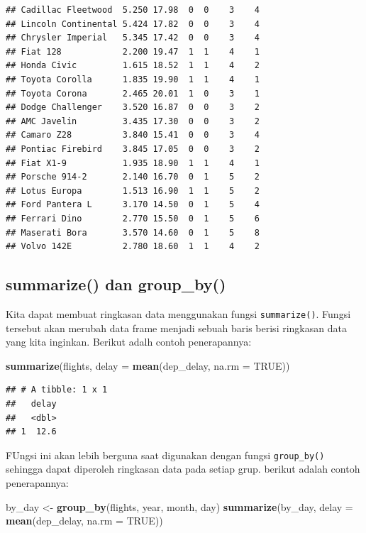 \documentclass[]{book}
\newenvironment{Shaded}{\begin{snugshade}}{\end{snugshade}}
\newcommand{\KeywordTok}[1]{\textcolor[rgb]{0.13,0.29,0.53}{\textbf{#1}}}
\newcommand{\DataTypeTok}[1]{\textcolor[rgb]{0.13,0.29,0.53}{#1}}
\newcommand{\StringTok}[1]{\textcolor[rgb]{0.31,0.60,0.02}{#1}}
\newcommand{\OtherTok}[1]{\textcolor[rgb]{0.56,0.35,0.01}{#1}}
\newcommand{\NormalTok}[1]{#1}
\begin{document}
\begin{verbatim}
## Cadillac Fleetwood  5.250 17.98  0  0    3    4
## Lincoln Continental 5.424 17.82  0  0    3    4
## Chrysler Imperial   5.345 17.42  0  0    3    4
## Fiat 128            2.200 19.47  1  1    4    1
## Honda Civic         1.615 18.52  1  1    4    2
## Toyota Corolla      1.835 19.90  1  1    4    1
## Toyota Corona       2.465 20.01  1  0    3    1
## Dodge Challenger    3.520 16.87  0  0    3    2
## AMC Javelin         3.435 17.30  0  0    3    2
## Camaro Z28          3.840 15.41  0  0    3    4
## Pontiac Firebird    3.845 17.05  0  0    3    2
## Fiat X1-9           1.935 18.90  1  1    4    1
## Porsche 914-2       2.140 16.70  0  1    5    2
## Lotus Europa        1.513 16.90  1  1    5    2
## Ford Pantera L      3.170 14.50  0  1    5    4
## Ferrari Dino        2.770 15.50  0  1    5    6
## Maserati Bora       3.570 14.60  0  1    5    8
## Volvo 142E          2.780 18.60  1  1    4    2
\end{verbatim}

\subsection{summarize() dan group\_by()}\label{summarize-dan-group_by}

Kita dapat membuat ringkasan data menggunakan fungsi
\texttt{summarize()}. Fungsi tersebut akan merubah data frame menjadi
sebuah baris berisi ringkasan data yang kita inginkan. Berikut adalh
contoh penerapannya:

\begin{Shaded}
\begin{Highlighting}[]
\KeywordTok{summarize}\NormalTok{(flights, }\DataTypeTok{delay =} \KeywordTok{mean}\NormalTok{(dep_delay, }\DataTypeTok{na.rm =} \OtherTok{TRUE}\NormalTok{))}
\end{Highlighting}
\end{Shaded}

\begin{verbatim}
## # A tibble: 1 x 1
##   delay
##   <dbl>
## 1  12.6
\end{verbatim}

FUngsi ini akan lebih berguna saat digunakan dengan fungsi
\texttt{group\_by()} sehingga dapat diperoleh ringkasan data pada setiap
grup. berikut adalah contoh penerapannya:

\begin{Shaded}
\begin{Highlighting}[]
\NormalTok{by_day <-}\StringTok{ }\KeywordTok{group_by}\NormalTok{(flights, year, month, day)}
    \KeywordTok{summarize}\NormalTok{(by_day, }\DataTypeTok{delay =} \KeywordTok{mean}\NormalTok{(dep_delay, }\DataTypeTok{na.rm =} \OtherTok{TRUE}\NormalTok{))}
\end{Highlighting}
\end{Shaded}
\end{document}
